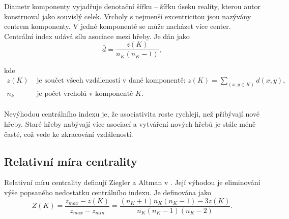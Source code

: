 \documentclass[dp.tex]{subfiles}
\begin{document}
Diametr komponenty vyjadřuje denotační šířku -- šířku úseku reality, kterou autor konstruoval jako souvislý celek. Vrcholy s nejmenší excentricitou jsou nazývány centrem komponenty. V jedné komponentě se může nacházet více center.
Centrální index udává sílu asociace mezi hřeby. Je dán jako
\begin{equation}
\bar{d}=\frac{z(K)}{n_K (n_K-1)},
\end{equation}

kde
\begin{align*}
	z(K) & \text{ je součet všech vzdáleností v dané komponentě: 
$z(K)=\sum_{(x,y \in K)} d(x,y)$,}\\
	n_k & \text{ je počet vrcholů v komponentě $K$.}\\
\end{align*}  

Nevýhodou centrálního indexu je, že asociativita roste rychleji, než přibývají nové hřeby. Staré hřeby nabývají více asociací a vytváření nových hřebů je stále méně časté, což vede ke zkracování vzdáleností.


\subsection{Relativní míra centrality}
Relativní míru centrality definují Ziegler a Altman v \cite{ZieglerAltmann2002}. Její výhodou je eliminování výše popsaného nedostatku centrálního indexu. Je definována jako
\begin{equation}
Z(K)=\frac{z_{max}-z(K)}{z_{max}-z_{min}}=
\frac{(n_K+1) n_K (n_K-1)-3z(K)}{n_K (n_K-1)(n_K-2)} .
\end{equation}
\end{document}
